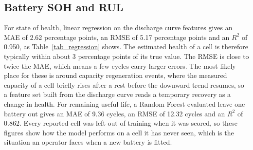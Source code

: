 \documentclass[conference]{IEEEtran}
\begin{document}
\subsection{Battery SOH and RUL}
For state of health, linear regression on the discharge curve features gives an MAE of 2.62 percentage points, an RMSE of 5.17 percentage points and an $R^2$ of 0.950, as Table~\ref{tab_regression} shows. The estimated health of a cell is therefore typically within about 3 percentage points of its true value. The RMSE is close to twice the MAE, which means a few cycles carry larger errors. The most likely place for these is around capacity regeneration events, where the measured capacity of a cell briefly rises after a rest before the downward trend resumes, so a feature set built from the discharge curve reads a temporary recovery as a change in health. For remaining useful life, a Random Forest evaluated leave one battery out gives an MAE of 9.36 cycles, an RMSE of 12.32 cycles and an $R^2$ of 0.862. Every reported cell was left out of training when it was scored, so these figures show how the model performs on a cell it has never seen, which is the situation an operator faces when a new battery is fitted.
\end{document}

